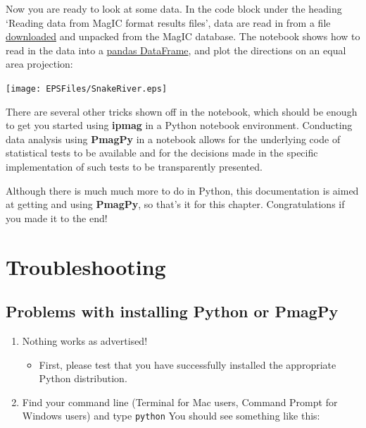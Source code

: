 \documentclass[11pt]{book}
\begin{document}
{{
 Now you are ready to look at some data.  In the code block under the heading `Reading data from MagIC format results files',  data are read in from a file \href{#magic_download}{downloaded} and unpacked from the MagIC database.   The notebook shows how to read in the data into a \href{#pandas}{pandas DataFrame}, and plot the directions on an equal area projection:

\texttt{[image: EPSFiles/SnakeRiver.eps]}

There are several other tricks shown off in the notebook, which should be enough to get you started using {\bf ipmag} in a Python notebook environment.  Conducting data analysis  using {\bf PmagPy} in a notebook allows for the underlying code of statistical tests to be available and for the decisions made in the specific implementation of such tests to be transparently presented.

Although there is much much more to do in Python, this documentation is aimed at getting and using {\bf PmagPy}, so that's it for this chapter. Congratulations if you made it to the end!


\chapter{Troubleshooting}
\label{chap:trouble}

\section{Problems with installing Python or PmagPy}

\begin{enumerate}

 \item Nothing works as advertised!


\begin{itemize}

\item First, please test that you have successfully installed the appropriate Python distribution.
\end{itemize}

\item Find your command line (Terminal for Mac users, Command Prompt for Windows users) and type \texttt{python}  You should see something like this:




\end{enumerate}}}
\end{document}
